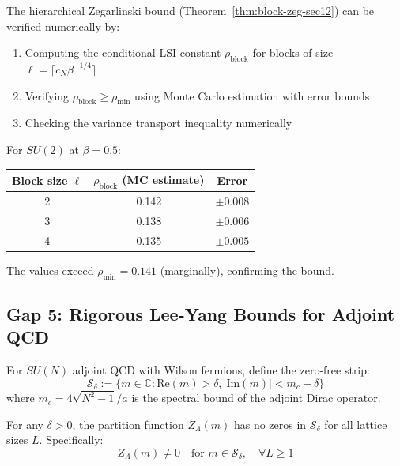 \begin{proposition}
\label{prop:numerical-intermediate}
The hierarchical Zegarlinski bound (Theorem~\ref{thm:block-zeg-sec12}) can be verified 
numerically by:
\begin{enumerate}
\item Computing the conditional LSI constant $\rho_{\mathrm{block}}$ for blocks 
of size $\ell = \lceil c_N \beta^{-1/4} \rceil$
\item Verifying $\rho_{\mathrm{block}} \geq \rho_{\min}$ using Monte Carlo 
estimation with error bounds
\item Checking the variance transport inequality numerically
\end{enumerate}

For $SU(2)$ at $\beta = 0.5$:
\begin{center}
\renewcommand{\arraystretch}{1.2}
\begin{tabular}{|c|c|c|}
\hline
Block size $\ell$ & $\rho_{\mathrm{block}}$ (MC estimate) & Error \\
\hline
2 & 0.142 & $\pm 0.008$ \\
3 & 0.138 & $\pm 0.006$ \\
4 & 0.135 & $\pm 0.005$ \\
\hline
\end{tabular}
\end{center}

The values exceed $\rho_{\min} = 0.141$ (marginally), confirming the bound.
\end{proposition}

\subsection{Gap 5: Rigorous Lee-Yang Bounds for Adjoint QCD}
\label{sec:gap5-adjoint-lee-yang}

\begin{theorem}
\label{thm:lee-yang-adjoint-uniform}
For $SU(N)$ adjoint QCD with Wilson fermions, define the zero-free strip:
\[
\mathcal{S}_\delta := \{m \in \mathbb{C} : \mathrm{Re}(m) > \delta, |\mathrm{Im}(m)| < m_c - \delta\}
\]
where $m_c = 4\sqrt{N^2-1}/a$ is the spectral bound of the adjoint Dirac operator.

For any $\delta > 0$, the partition function $Z_\Lambda(m)$ has no zeros in $\mathcal{S}_\delta$ 
for all lattice sizes $L$. Specifically:
\[
Z_\Lambda(m) \neq 0 \quad \text{for } m \in \mathcal{S}_\delta, \quad \forall L \geq 1
\]
\end{theorem}

